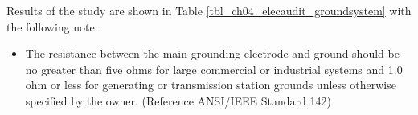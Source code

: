 Results of the study are shown in Table \ref{tbl_ch04_elecaudit_groundsystem} with the following note:

\begin{itemize}
\item The resistance between the main grounding electrode and ground should be no greater
than five ohms for large commercial or industrial systems and 1.0 ohm or less for generating or transmission station grounds unless otherwise specified by the owner. (Reference ANSI/IEEE Standard 142)
 
\end{itemize}








